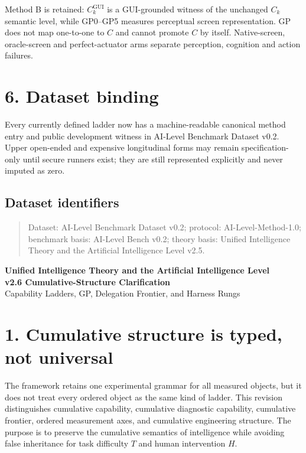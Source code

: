 \documentclass[11pt]{article}
\newcommand{\addendumtitle}[2]{%
  \begin{center}
    {\large\bfseries Unified Intelligence Theory and the Artificial Intelligence Level}\\[0.4em]
    {\bfseries #1}\\[0.2em]
    {\small #2}
  \end{center}
  \vspace{0.5em}}
\begin{document}
Method B is retained: $C^{\mathrm{GUI}}_k$ is a GUI-grounded witness of the unchanged $C_k$ semantic level, while GP0--GP5 measures perceptual screen representation. GP does not map one-to-one to $C$ and cannot promote $C$ by itself. Native-screen, oracle-screen and perfect-actuator arms separate perception, cognition and action failures.

\section*{6. Dataset binding}

Every currently defined ladder now has a machine-readable canonical method entry and public development witness in AI-Level Benchmark Dataset v0.2. Upper open-ended and expensive longitudinal forms may remain specification-only until secure runners exist; they are still represented explicitly and never imputed as zero.

\subsection*{Dataset identifiers}

\begin{quote}
Dataset: AI-Level Benchmark Dataset v0.2; protocol: AI-Level-Method-1.0; benchmark basis: AI-Level Bench v0.2; theory basis: Unified Intelligence Theory and the Artificial Intelligence Level v2.5.
\end{quote}

\clearpage

\addendumtitle{v2.6 Cumulative-Structure Clarification}{Capability Ladders, GP, Delegation Frontier, and Harness Rungs}

\section*{1. Cumulative structure is typed, not universal}

The framework retains one experimental grammar for all measured objects, but it does not treat every ordered object as the same kind of ladder. This revision distinguishes cumulative capability, cumulative diagnostic capability, cumulative frontier, ordered measurement axes, and cumulative engineering structure. The purpose is to preserve the cumulative semantics of intelligence while avoiding false inheritance for task difficulty $T$ and human intervention $H$.
\end{document}
